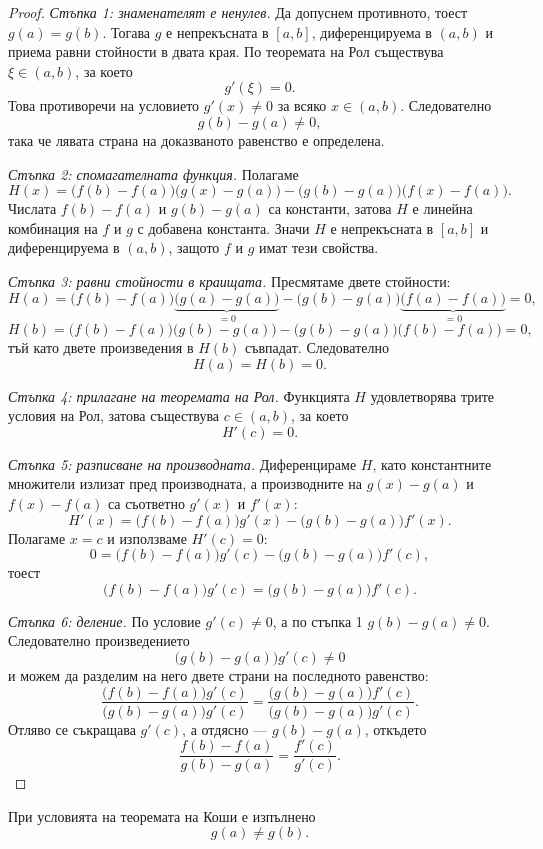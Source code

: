 \begin{proof}
\emph{Стъпка 1: знаменателят е ненулев.} Да допуснем противното, тоест $g(a)=g(b)$. Тогава $g$ е непрекъсната в $[a,b]$, диференцируема в $(a,b)$ и приема равни стойности в двата края. По теоремата на Рол съществува $\xi\in(a,b)$, за което
\[
g'(\xi)=0.
\]
Това противоречи на условието $g'(x)\ne 0$ за всяко $x\in(a,b)$. Следователно
\[
g(b)-g(a)\ne 0,
\]
така че лявата страна на доказваното равенство е определена.

\emph{Стъпка 2: спомагателната функция.} Полагаме
\[
H(x)=\bigl(f(b)-f(a)\bigr)\bigl(g(x)-g(a)\bigr)-\bigl(g(b)-g(a)\bigr)\bigl(f(x)-f(a)\bigr).
\]
Числата $f(b)-f(a)$ и $g(b)-g(a)$ са константи, затова $H$ е линейна комбинация на $f$ и $g$ с добавена константа. Значи $H$ е непрекъсната в $[a,b]$ и диференцируема в $(a,b)$, защото $f$ и $g$ имат тези свойства.

\emph{Стъпка 3: равни стойности в краищата.} Пресмятаме двете стойности:
\[
H(a)=\bigl(f(b)-f(a)\bigr)\underbrace{\bigl(g(a)-g(a)\bigr)}_{=0}-\bigl(g(b)-g(a)\bigr)\underbrace{\bigl(f(a)-f(a)\bigr)}_{=0}=0,
\]
\[
H(b)=\bigl(f(b)-f(a)\bigr)\bigl(g(b)-g(a)\bigr)-\bigl(g(b)-g(a)\bigr)\bigl(f(b)-f(a)\bigr)=0,
\]
тъй като двете произведения в $H(b)$ съвпадат. Следователно
\[
H(a)=H(b)=0.
\]

\emph{Стъпка 4: прилагане на теоремата на Рол.} Функцията $H$ удовлетворява трите условия на Рол, затова съществува $c\in(a,b)$, за което
\[
H'(c)=0.
\]

\emph{Стъпка 5: разписване на производната.} Диференцираме $H$, като константните множители излизат пред производната, а производните на $g(x)-g(a)$ и $f(x)-f(a)$ са съответно $g'(x)$ и $f'(x)$:
\[
H'(x)=\bigl(f(b)-f(a)\bigr)g'(x)-\bigl(g(b)-g(a)\bigr)f'(x).
\]
Полагаме $x=c$ и използваме $H'(c)=0$:
\[
0=\bigl(f(b)-f(a)\bigr)g'(c)-\bigl(g(b)-g(a)\bigr)f'(c),
\]
тоест
\[
\bigl(f(b)-f(a)\bigr)g'(c)=\bigl(g(b)-g(a)\bigr)f'(c).
\]

\emph{Стъпка 6: деление.} По условие $g'(c)\ne 0$, а по стъпка 1 $g(b)-g(a)\ne 0$. Следователно произведението
\[
\bigl(g(b)-g(a)\bigr)g'(c)\ne 0
\]
и можем да разделим на него двете страни на последното равенство:
\[
\frac{\bigl(f(b)-f(a)\bigr)g'(c)}{\bigl(g(b)-g(a)\bigr)g'(c)}
=
\frac{\bigl(g(b)-g(a)\bigr)f'(c)}{\bigl(g(b)-g(a)\bigr)g'(c)}.
\]
Отляво се съкращава $g'(c)$, а отдясно --- $g(b)-g(a)$, откъдето
\[
\frac{f(b)-f(a)}{g(b)-g(a)}
=
\frac{f'(c)}{g'(c)}.
\]
\end{proof}

\begin{prop}
При условията на теоремата на Коши е изпълнено
\[
g(a)\ne g(b).
\]
\end{prop}

